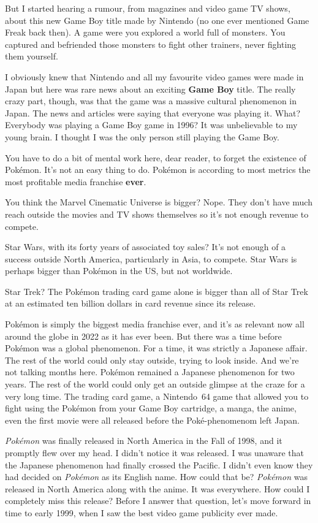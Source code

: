 \documentclass{book}
\begin{document}
But I started hearing a rumour, from magazines and video game TV shows, about this new Game Boy title made by Nintendo (no one ever mentioned Game Freak back then). A game were you explored a world full of monsters. You captured and befriended those monsters to fight other trainers, never fighting them yourself.

I obviously knew that Nintendo and all my favourite video games were made in Japan but here was rare news about an exciting \textbf{Game Boy} title. The really crazy part, though, was that the game was a massive cultural phenomenon in Japan. The news and articles were saying that everyone was playing it. What? Everybody was playing a Game Boy game in 1996? It was unbelievable to my young brain. I thought I was the only person still playing the Game Boy.

You have to do a bit of mental work here, dear reader, to forget the existence of Pokémon. It’s not an easy thing to do. Pokémon is according to most metrics the most profitable media franchise \textbf{ever}.

You think the Marvel Cinematic Universe is bigger? Nope. They don’t have much reach outside the movies and TV shows themselves so it’s not enough revenue to compete.

Star Wars, with its forty years of associated toy sales? It’s not enough of a success outside North America, particularly in Asia, to compete. Star Wars is perhaps bigger than Pokémon in the US, but not worldwide.

Star Trek? The Pokémon trading card game alone is bigger than all of Star Trek at an estimated ten billion dollars in card revenue since its release.

Pokémon is simply the biggest media franchise ever, and it’s as relevant now all around the globe in 2022 as it has ever been. But there was a time before Pokémon was a global phenomenon. For a time, it was strictly a Japanese affair. The rest of the world could only stay outside, trying to look inside. And we’re not talking months here. Pokémon remained a Japanese phenomenon for two years. The rest of the world could only get an outside glimpse at the craze for a very long time. The trading card game, a Nintendo 64 game that allowed you to fight using the Pokémon from your Game Boy cartridge, a manga, the anime, even the first movie were all released before the Poké-phenomenom left Japan.

\emph{Pokémon} was finally released in North America in the Fall of 1998, and it promptly flew over my head. I didn’t notice it was released. I was unaware that the Japanese phenomenon had finally crossed the Pacific. I didn’t even know they had decided on \emph{Pokémon} as its English name. How could that be? \emph{Pokémon} was released in North America along with the anime. It was everywhere. How could I completely miss this release? Before I answer that question, let’s move forward in time to early 1999, when I saw the best video game publicity ever made.
\end{document}
